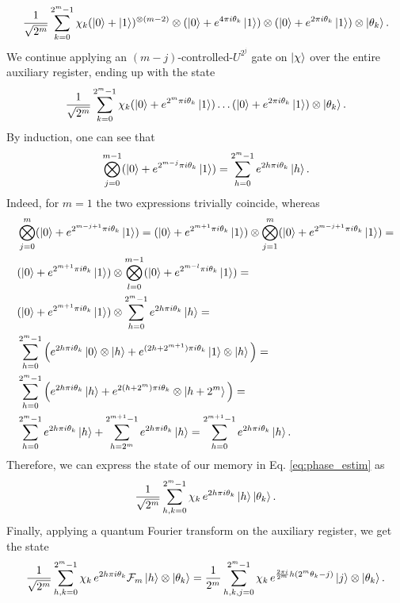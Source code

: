 \documentclass[a4paper,10pt]{report}
\begin{document}
\begin{equation}
\frac{1}{\sqrt{2^m}}\sum_{k=0}^{2^m-1}\chi_k(\ket{0}+\ket{1})^{\otimes(m-2)}\otimes(\ket{0} + e^{4\pi i\theta_k}\ket{1})\otimes(\ket{0} + e^{2\pi i\theta_k}\ket{1})\otimes\ket{\theta_k}.
\end{equation}
We continue applying an $(m-j)$-controlled-$U^{2^j}$ gate on $\ket{\chi}$ over the entire auxiliary register, ending up with the state
\begin{equation}
\frac{1}{\sqrt{2^m}}\sum_{k=0}^{2^m-1}\chi_k(\ket{0} + e^{2^m\pi i\theta_k}\ket{1})\dots(\ket{0} + e^{2\pi i\theta_k}\ket{1})\otimes\ket{\theta_k}.
\end{equation}
By induction, one can see that
\begin{equation}
\bigotimes_{j=0}^{m-1}(\ket{0} + e^{2^{m-j}\pi i\theta_k}\ket{1}) = \sum_{h=0}^{2^m-1}e^{2h\pi i\theta_k}\ket{h}.
\end{equation}
Indeed, for $m=1$ the two expressions trivially coincide, whereas 
\begin{align}
&\bigotimes_{j=0}^{m}(\ket{0} + e^{2^{m-j+1}\pi i\theta_k}\ket{1}) = (\ket{0} + e^{2^{m+1}\pi i\theta_k}\ket{1})\otimes \bigotimes_{j=1}^m(\ket{0} + e^{2^{m-j+1}\pi i\theta_k}\ket{1}) = \nonumber\\
&(\ket{0} + e^{2^{m+1}\pi i\theta_k}\ket{1})\otimes \bigotimes_{l=0}^{m-1}(\ket{0} + e^{2^{m-l}\pi i\theta_k}\ket{1}) = \nonumber\\
&(\ket{0} + e^{2^{m+1}\pi i\theta_k}\ket{1})\otimes\sum_{h=0}^{2^m-1}e^{2h\pi i\theta_k}\ket{h} = \nonumber\\
&\sum_{h=0}^{2^m-1}\Big(e^{2h\pi i\theta_k}\ket{0}\otimes\ket{h} + e^{(2h+2^{m+1})\pi i\theta_k}\ket{1}\otimes\ket{h}\Big) = \nonumber\\
&\sum_{h=0}^{2^m-1}\Big(e^{2h\pi i\theta_k}\ket{h} + e^{2(h+2^m)\pi i\theta_k}\otimes\ket{h+2^m}\Big) = \nonumber\\
&\sum_{h=0}^{2^m-1}e^{2h\pi i\theta_k}\ket{h} + \sum_{h=2^m}^{2^{m+1}-1}e^{2h\pi i\theta_k}\ket{h} =  \sum_{h=0}^{2^{m+1}-1}e^{2h\pi i\theta_k}\ket{h}.
\end{align}
Therefore, we can express the state of our memory in Eq. \eqref{eq:phase_estim} as
\begin{equation}
\frac{1}{\sqrt{2^m}}\sum_{h,k=0}^{2^m-1}\chi_k\,e^{2h\pi i\theta_k}\ket{h}\ket{\theta_k}.
\end{equation}
Finally, applying a quantum Fourier transform on the auxiliary register, we get the state
\begin{equation}
\frac{1}{\sqrt{2^m}}\sum_{h,k=0}^{2^m-1}\chi_k\,e^{2h\pi i\theta_k}\mathcal{F}_m\ket{h}\otimes\ket{\theta_k} = \frac{1}{2^m}\sum_{h,k,j=0}^{2^m-1}\chi_k\,e^{\frac{2\pi i}{2^m}h(2^m\theta_k-j)}\ket{j}\otimes\ket{\theta_k}.
\end{equation}
\end{document}
